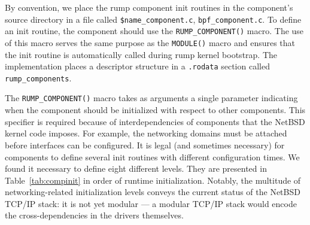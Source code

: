 By convention, we place the rump component init routines in the
component's source directory in a file called \verb+$name_component.c+,
\eg \verb+bpf_component.c+.
To define an init routine,  the component should use the
\verb+RUMP_COMPONENT()+ macro.  The use of this macro serves the
same purpose as the \verb+MODULE()+ macro and ensures that the init
routine is automatically called during rump kernel bootstrap.
The implementation places a descriptor structure in a \texttt{.rodata}
section called \verb+rump_components+.

The \verb+RUMP_COMPONENT()+ macro takes as arguments a single
parameter indicating when the component should be initialized
with respect to other components.
This specifier is required because of interdependencies of components
that the NetBSD kernel code imposes.  For example, the networking
domains must be attached before interfaces can be configured.  It
is legal (and sometimes necessary) for components to define several init
routines with different configuration times.  We found it necessary
to define eight different levels.  They are presented in
Table~\ref{tab:compinit} in order of runtime initialization.  Notably, the
multitude of networking-related initialization levels conveys the
current status of the NetBSD TCP/IP stack: it is not yet modular --- a
modular TCP/IP stack would encode the cross-dependencies in the
drivers themselves.

